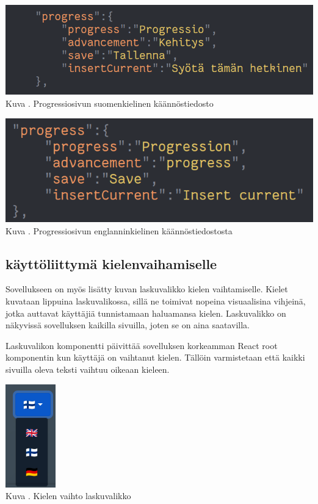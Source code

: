 \documentclass[11pt,a4paper,titlepage,oneside]{article}
\begin{document}
\bigskip
\includegraphics[width = 15cm]{src/public/oppar/translationfile.png}\\
Kuva \getImgCount. {} Progressiosivun suomenkielinen käännöstiedosto 
\medskip


\bigskip
\includegraphics[width = 15cm]{src/public/oppar/translationfileEng.png}\\
Kuva \getImgCount {}. Progressiosivun englanninkielinen käännöstiedostosta
\medskip




\subsection{käyttöliittymä kielenvaihamiselle}


Sovellukseen on myös lisätty kuvan \nextImageCount{} laskuvalikko kielen vaihtamiselle. 
Kielet kuvataan lippuina laskuvalikossa,
sillä ne toimivat nopeina visuaalisina vihjeinä, jotka auttavat käyttäjiä tunnistamaan haluamansa kielen.
Laskuvalikko on näkyvissä sovelluksen kaikilla sivuilla, joten se on aina saatavilla.
\medskip



Laskuvalikon komponentti päivittää sovelluksen korkeamman React root komponentin kun käyttäjä on vaihtanut kielen.
Tällöin varmistetaan että kaikki sivuilla oleva teksti vaihtuu oikeaan kieleen.
\medskip


\bigskip
\includegraphics[]{src/public/locale_laskuvalikko.png}\\
Kuva \getImgCount {}. Kielen vaihto laskuvalikko
\end{document}

